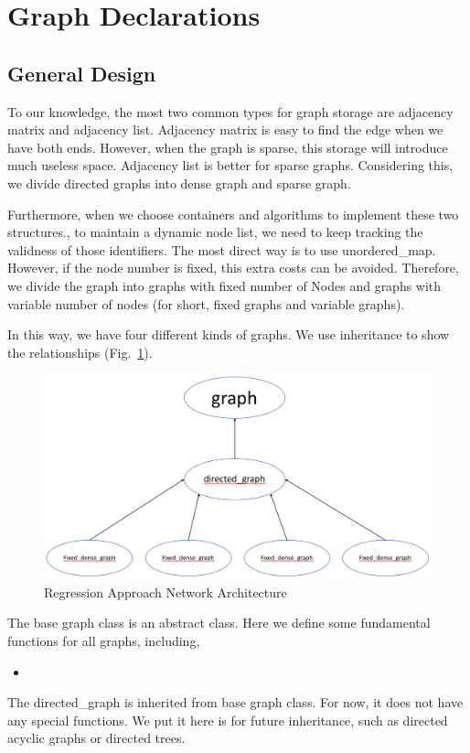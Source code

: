 \documentclass[]{article}
\begin{document}
\section{Graph Declarations}
\subsection{General Design}
To our knowledge, the most two common types for graph storage are adjacency matrix and adjacency list. Adjacency matrix is easy to find the edge when we have both ends. However, when the graph is sparse, this storage will introduce much useless space. Adjacency list is better for sparse graphs. Considering this, we divide directed graphs into dense graph and sparse graph.

Furthermore, when we choose containers and algorithms to implement these two structures., to maintain a dynamic node list, we need to keep tracking the validness of those identifiers. The most direct way is to use unordered\_map. However, if the node number is fixed, this extra costs can be avoided. Therefore, we divide the graph into graphs with fixed number of Nodes and graphs with variable number of nodes (for short, fixed graphs and variable graphs).

In this way, we have four different kinds of graphs. We use inheritance to show the relationships (Fig.~\ref{fig:graph}).
\begin{figure}
	\centering
	\includegraphics[scale=0.4]{graph.png}
	\caption{Regression Approach Network Architecture}
	
	\label{fig:graph}
\end{figure}
The base graph class is an abstract class. Here we define some fundamental functions for all graphs, including,
\begin{itemize}
	\item
\end{itemize}
The directed\_graph is inherited from base graph class. For now, it does not have any special functions. We put it here is for future inheritance, such as directed acyclic graphs or directed trees.
\end{document}
